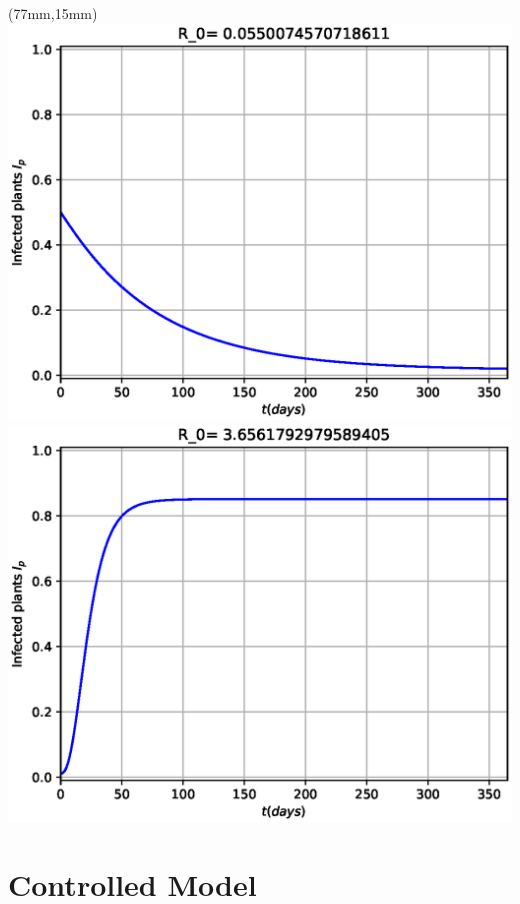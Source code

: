 \documentclass[10pt]{beamer}
\begin{document}
\begin{frame}
\begin{textblock*}{50mm}
		
	\end{textblock*}
	\begin{textblock*}{50mm}(77mm,15mm)
		\includegraphics[width=\linewidth]{Feathergraphics/Tomato_simulation_1.eps}
		\includegraphics[width=\linewidth]{Feathergraphics/Tomato_simulation_2.eps}
	\end{textblock*}	
\end{frame}
%
\section{Controlled Model}
\end{document}
